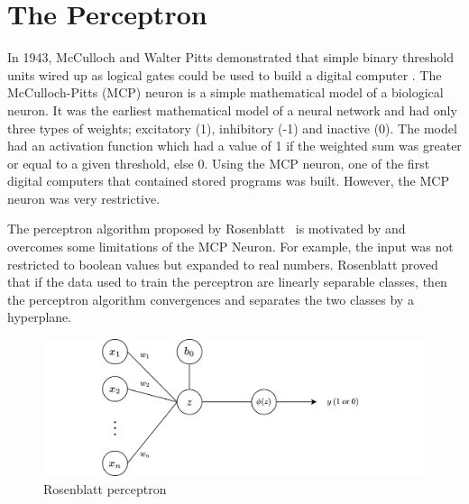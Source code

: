 \section{The Perceptron}
In 1943, McCulloch and Walter Pitts demonstrated that simple binary threshold units wired up as logical gates could be used to build a digital computer \cite{McCulloch:1943aa}. The McCulloch-Pitts (MCP) neuron is a simple mathematical model of a biological neuron. It was the earliest mathematical model of a neural network and had only three types of weights; excitatory (1), inhibitory (-1) and inactive (0). The model had an activation function which had a value of 1 if the weighted sum was greater or equal to a given threshold, else 0. Using the MCP neuron, one of the first digital computers that contained stored programs was built. However, the MCP neuron was very restrictive.
\par The perceptron algorithm proposed by Rosenblatt~\cite{Rosenblatt:1958aa} is motivated by and overcomes some limitations of the MCP Neuron. For example, the input was not restricted to boolean values but expanded to real numbers. Rosenblatt proved that if the data used to train the perceptron are linearly separable classes, then the perceptron algorithm convergences and separates the two classes by a hyperplane.

\begin{figure}[H]
  \centering
  \includegraphics[scale=0.95]{CHAPTER_2/c2_fig_perceptron_2_draw.png}
  \caption{Rosenblatt perceptron}
  \label{rosenblatt_perceptron}
\end{figure}


